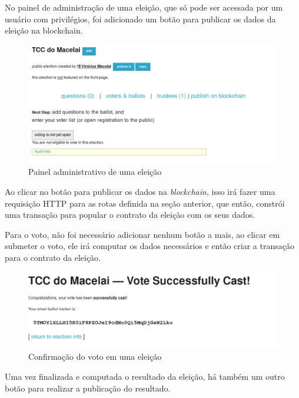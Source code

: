 \documentclass{ufsctex/ufsctex}
\begin{document}
No painel de administração de uma eleição, que só pode ser acessada por um
usuário com privilégios, foi adicionado um botão para publicar os dados da
eleição na blockchain.

\begin{figure}[H]
	\centering
	\includegraphics[width=\linewidth]{helios-1}
	\caption{Painel administrativo de uma eleição}
	\label{fig:helios-1}
\end{figure}

Ao clicar no botão para publicar os dados na \textit{blockchain}, isso irá
fazer uma requisição HTTP para as rotas definida na seção anterior, que
então, constrói uma transação para popular o contrato da eleição com os seus
dados.

Para o voto, não foi necessário adicionar nenhum botão a mais, ao clicar em
submeter o voto, ele irá computar os dados necessários e então criar a
transação para o contrato da eleição.

\begin{figure}[H]
	\centering
	\includegraphics[width=\linewidth]{helios-voting}
	\caption{Confirmação do voto em uma eleição}
	\label{fig:helios-2}
\end{figure}

Uma vez finalizada e computada o resultado da eleição, há também um outro botão
para realizar a publicação do resultado.
\end{document}
